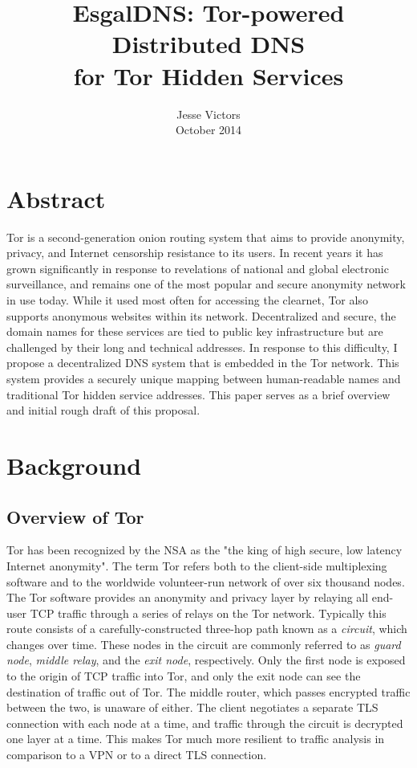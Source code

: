 \documentclass[journal]{IEEEtran}
\begin{document}
\title{EsgalDNS: Tor-powered Distributed DNS \\ for Tor Hidden Services}
\author{Jesse Victors \\ October 2014}

\maketitle

\section{Abstract}

Tor is a second-generation onion routing system that aims to provide anonymity, privacy, and Internet censorship resistance to its users. In recent years it has grown significantly in response to revelations of national and global electronic surveillance, and remains one of the most popular and secure anonymity network in use today. While it used most often for accessing the clearnet, Tor also supports anonymous websites within its network. Decentralized and secure, the domain names for these services are tied to public key infrastructure but are challenged by their long and technical addresses. In response to this difficulty, I propose a decentralized DNS system that is embedded in the Tor network. This system provides a securely unique mapping between human-readable names and traditional Tor hidden service addresses. This paper serves as a brief overview and initial rough draft of this proposal.

\section{Background}

\subsection{Overview of Tor}

Tor has been recognized by the NSA as the "the king of high secure, low latency Internet anonymity". The term Tor refers both to the client-side multiplexing software and to the worldwide volunteer-run network of over six thousand nodes. The Tor software provides an anonymity and privacy layer by relaying all end-user TCP traffic through a series of relays on the Tor network. Typically this route consists of a carefully-constructed three-hop path known as a \textit{circuit}, which changes over time. These nodes in the circuit are commonly referred to as \textit{guard node}, \textit{middle relay}, and the \textit{exit node}, respectively. Only the first node is exposed to the origin of TCP traffic into Tor, and only the exit node can see the destination of traffic out of Tor. The middle router, which passes encrypted traffic between the two, is unaware of either. The client negotiates a separate TLS connection with each node at a time, and traffic through the circuit is decrypted one layer at a time. This makes Tor much more resilient to traffic analysis in comparison to a VPN or to a direct TLS connection.
\end{document}

